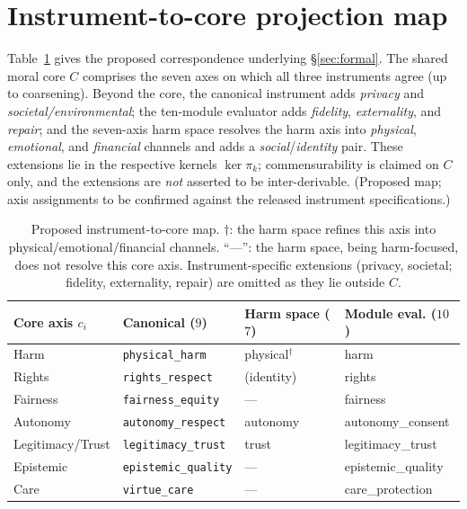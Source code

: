 \appendix
\section{Instrument-to-core projection map}
\label{app:map}
Table~\ref{tab:map} gives the proposed correspondence underlying \S\ref{sec:formal}. The
shared moral core $C$ comprises the seven axes on which all three instruments agree (up to
coarsening). Beyond the core, the canonical instrument adds \emph{privacy} and
\emph{societal/environmental}; the ten-module evaluator adds \emph{fidelity},
\emph{externality}, and \emph{repair}; and the seven-axis harm space resolves the harm axis
into \emph{physical}, \emph{emotional}, and \emph{financial} channels and adds a
\emph{social}/\emph{identity} pair. These extensions lie in the respective kernels
$\ker\pi_k$; commensurability is claimed on $C$ only, and the extensions are \emph{not}
asserted to be inter-derivable. (Proposed map; axis assignments to be confirmed against the
released instrument specifications.)

\begin{table}[h]
\centering
\small
\begin{tabular}{@{}llll@{}}
\toprule
Core axis $c_i$ & Canonical ($9$) & Harm space ($7$) & Module eval. ($10$) \\
\midrule
Harm              & \texttt{physical\_harm}    & physical$^\dagger$ & harm \\
Rights            & \texttt{rights\_respect}   & (identity)         & rights \\
Fairness          & \texttt{fairness\_equity}  & ---                & fairness \\
Autonomy          & \texttt{autonomy\_respect} & autonomy           & autonomy\_consent \\
Legitimacy/Trust  & \texttt{legitimacy\_trust} & trust              & legitimacy\_trust \\
Epistemic         & \texttt{epistemic\_quality}& ---                & epistemic\_quality \\
Care              & \texttt{virtue\_care}      & ---                & care\_protection \\
\bottomrule
\end{tabular}
\caption{Proposed instrument-to-core map. $\dagger$: the harm space refines this axis into
physical/emotional/financial channels. ``---'': the harm space, being harm-focused, does not
resolve this core axis. Instrument-specific extensions (privacy, societal; fidelity,
externality, repair) are omitted as they lie outside $C$.}
\label{tab:map}
\end{table}

